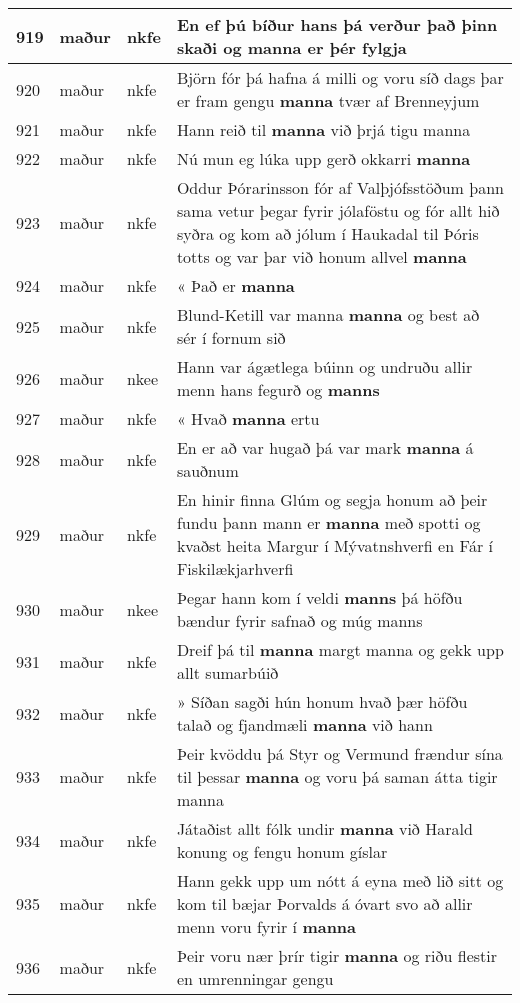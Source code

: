 \documentclass{article}
\begin{document}
\begin{longtable}{p{1cm}|p{1cm}|p{1cm}|p{13cm}}
\hline
919&maður&nkfe&En ef þú bíður hans þá verður það þinn skaði og \textbf{manna} er þér fylgja\\
\hline
920&maður&nkfe&Björn fór þá hafna á milli og voru síð dags þar er fram gengu \textbf{manna} tvær af Brenneyjum\\
\hline
921&maður&nkfe&Hann reið til \textbf{manna} við þrjá tigu manna\\
\hline
922&maður&nkfe&Nú mun eg lúka upp gerð okkarri \textbf{manna} \\
\hline
923&maður&nkfe&Oddur Þórarinsson fór af Valþjófsstöðum þann sama vetur þegar fyrir jólaföstu og fór allt hið syðra og kom að jólum í Haukadal til Þóris totts og var þar við honum allvel \textbf{manna} \\
\hline
924&maður&nkfe&« Það er \textbf{manna} \\
\hline
925&maður&nkfe&Blund-Ketill var manna \textbf{manna} og best að sér í fornum sið\\
\hline
926&maður&nkee&Hann var ágætlega búinn og undruðu allir menn hans fegurð og \textbf{manns} \\
\hline
927&maður&nkfe&« Hvað \textbf{manna} ertu\\
\hline
928&maður&nkfe&En er að var hugað þá var mark \textbf{manna} á sauðnum\\
\hline
929&maður&nkfe&En hinir finna Glúm og segja honum að þeir fundu þann mann er \textbf{manna} með spotti og kvaðst heita Margur í Mývatnshverfi en Fár í Fiskilækjarhverfi\\
\hline
930&maður&nkee&Þegar hann kom í veldi \textbf{manns} þá höfðu bændur fyrir safnað og múg manns\\
\hline
931&maður&nkfe&Dreif þá til \textbf{manna} margt manna og gekk upp allt sumarbúið\\
\hline
932&maður&nkfe&» Síðan sagði hún honum hvað þær höfðu talað og fjandmæli \textbf{manna} við hann\\
\hline
933&maður&nkfe&Þeir kvöddu þá Styr og Vermund frændur sína til þessar \textbf{manna} og voru þá saman átta tigir manna\\
\hline
934&maður&nkfe&Játaðist allt fólk undir \textbf{manna} við Harald konung og fengu honum gíslar\\
\hline
935&maður&nkfe&Hann gekk upp um nótt á eyna með lið sitt og kom til bæjar Þorvalds á óvart svo að allir menn voru fyrir í \textbf{manna} \\
\hline
936&maður&nkfe&Þeir voru nær þrír tigir \textbf{manna} og riðu flestir en umrenningar gengu\\

\end{longtable}
\end{document}
